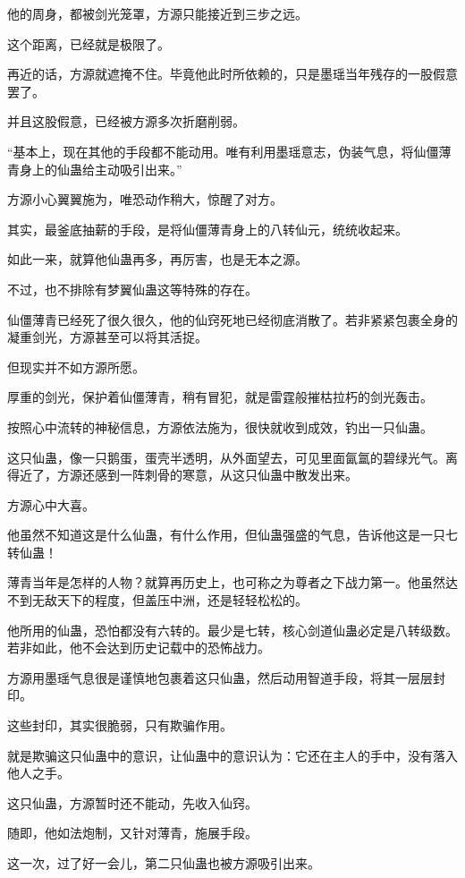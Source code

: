 \begin{this_body}
他的周身，都被剑光笼罩，方源只能接近到三步之远。

这个距离，已经就是极限了。

再近的话，方源就遮掩不住。毕竟他此时所依赖的，只是墨瑶当年残存的一股假意罢了。

并且这股假意，已经被方源多次折磨削弱。

“基本上，现在其他的手段都不能动用。唯有利用墨瑶意志，伪装气息，将仙僵薄青身上的仙蛊给主动吸引出来。”

方源小心翼翼施为，唯恐动作稍大，惊醒了对方。

其实，最釜底抽薪的手段，是将仙僵薄青身上的八转仙元，统统收起来。

如此一来，就算他仙蛊再多，再厉害，也是无本之源。

不过，也不排除有梦翼仙蛊这等特殊的存在。

仙僵薄青已经死了很久很久，他的仙窍死地已经彻底消散了。若非紧紧包裹全身的凝重剑光，方源甚至可以将其活捉。

但现实并不如方源所愿。

厚重的剑光，保护着仙僵薄青，稍有冒犯，就是雷霆般摧枯拉朽的剑光轰击。

按照心中流转的神秘信息，方源依法施为，很快就收到成效，钓出一只仙蛊。

这只仙蛊，像一只鹅蛋，蛋壳半透明，从外面望去，可见里面氤氲的碧绿光气。离得近了，方源还感到一阵刺骨的寒意，从这只仙蛊中散发出来。

方源心中大喜。

他虽然不知道这是什么仙蛊，有什么作用，但仙蛊强盛的气息，告诉他这是一只七转仙蛊！

薄青当年是怎样的人物？就算再历史上，也可称之为尊者之下战力第一。他虽然达不到无敌天下的程度，但盖压中洲，还是轻轻松松的。

他所用的仙蛊，恐怕都没有六转的。最少是七转，核心剑道仙蛊必定是八转级数。若非如此，他不会达到历史记载中的恐怖战力。

方源用墨瑶气息很是谨慎地包裹着这只仙蛊，然后动用智道手段，将其一层层封印。

这些封印，其实很脆弱，只有欺骗作用。

就是欺骗这只仙蛊中的意识，让仙蛊中的意识认为：它还在主人的手中，没有落入他人之手。

这只仙蛊，方源暂时还不能动，先收入仙窍。

随即，他如法炮制，又针对薄青，施展手段。

这一次，过了好一会儿，第二只仙蛊也被方源吸引出来。

\end{this_body}

